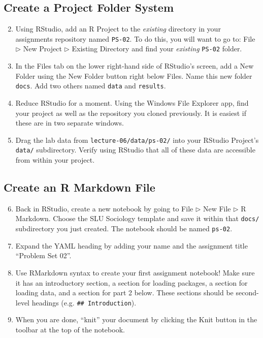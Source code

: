 \documentclass{tufte-handout}
\begin{document}
\subsection{Create a Project Folder System}
\begin{enumerate}[label=\alph*.]
\setcounter{enumi}{1}
\item Using RStudio, add an R Project to the \textit{existing} directory in your assignments repository named \texttt{PS-02}. To do this, you will want to go to: \textsf{File $\triangleright$} {\color{red}\textsf{New Project}} \textsf{$\triangleright$ Existing Directory} and find your \textit{existing} \texttt{PS-02} folder.
\item In the \textsf{Files} tab on the lower right-hand side of RStudio's screen, add a New Folder using the \textsf{New Folder} button right below \textsf{Files}. Name this new folder \texttt{docs}. Add two others named \texttt{data} and \texttt{results}.
\item Reduce RStudio for a moment. Using the Windows File Explorer app, find your project as well as the repository you cloned previously. It is easiest if these are in two separate windows.
\item Drag the lab data from \texttt{lecture-06/data/ps-02/} into your RStudio Project's \texttt{data/} subdirectory. Verify using RStudio that all of these data are accessible from within your project.
\end{enumerate}

\vspace{3mm}
\subsection{Create an R Markdown File}
\begin{enumerate}[label=\alph*.]
\setcounter{enumi}{5}
\item Back in RStudio, create a new notebook by going to \textsf{File $\triangleright$ New File $\triangleright$} {\color{red}\textsf{R Markdown}}. Choose the SLU Sociology template and save it within that \texttt{docs/} subdirectory you just created. The notebook should be named \texttt{ps-02}.
\item Expand the YAML heading by adding your name and the assignment title ``Problem Set 02''.
\item Use RMarkdown syntax to create your first assignment notebook! Make sure it has an introductory section, a section for loading packages, a section for loading data, and a section for part 2 below. These sections should be second-level headings (e.g. \texttt{\#\# Introduction}). 
\item When you are done, ``knit'' your document by clicking the \textsf{Knit} button in the toolbar at the top of the notebook.
\end{enumerate}
\end{document}
